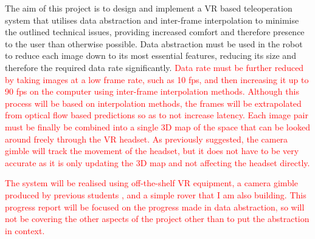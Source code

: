 The aim of this project is to design and implement a VR based teleoperation system that utilises data abstraction and inter-frame interpolation to minimise the outlined technical issues, providing increased comfort and therefore presence to the user than otherwise possible. Data abstraction must be used in the robot to reduce each image down to its most essential features, reducing its size and therefore the required data rate significantly. \textcolor{red}{Data rate must be further reduced by taking images at a low frame rate, such as 10 fps, and then increasing it up to 90 fps on the computer using inter-frame interpolation methods. Although this process will be based on interpolation methods, the frames will be extrapolated from optical flow based predictions so as to not increase latency. Each image pair must be finally be combined into a single 3D map of the space that can be looked around freely through the VR headset. As previously suggested, the camera gimble will track the movement of the headset, but it does not have to be very accurate as it is only updating the 3D map and not affecting the headset directly.}

\textcolor{red}{The system will be realised using off-the-shelf VR equipment, a camera gimble produced by previous students \cite{gimble}, and a simple rover that I am also building. This progress report will be focused on the progress made in data abstraction, so will not be covering the other aspects of the project other than to put the abstraction in context.}
